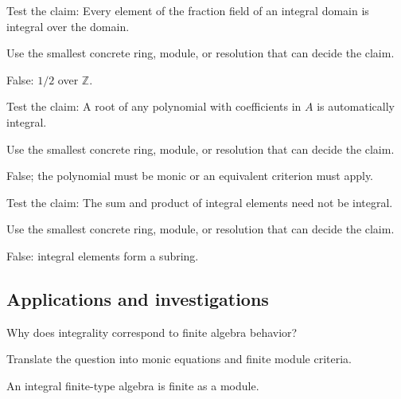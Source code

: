\begin{exercise}\label{exr:v19-expand-10}
Test the claim: Every element of the fraction field of an integral domain is integral over the domain.
\end{exercise}
\begin{hint}
Use the smallest concrete ring, module, or resolution that can decide the claim.
\end{hint}
\begin{solution}
False: $1/2$ over $\mathbb Z$.
\end{solution}

\begin{exercise}\label{exr:v19-expand-11}
Test the claim: A root of any polynomial with coefficients in $A$ is automatically integral.
\end{exercise}
\begin{hint}
Use the smallest concrete ring, module, or resolution that can decide the claim.
\end{hint}
\begin{solution}
False; the polynomial must be monic or an equivalent criterion must apply.
\end{solution}

\begin{exercise}\label{exr:v19-expand-12}
Test the claim: The sum and product of integral elements need not be integral.
\end{exercise}
\begin{hint}
Use the smallest concrete ring, module, or resolution that can decide the claim.
\end{hint}
\begin{solution}
False: integral elements form a subring.
\end{solution}

\subsection*{Applications and investigations}

\begin{exercise}\label{exr:v19-expand-13}
Why does integrality correspond to finite algebra behavior?
\end{exercise}
\begin{hint}
Translate the question into monic equations and finite module criteria.
\end{hint}
\begin{solution}
An integral finite-type algebra is finite as a module.
\end{solution}

